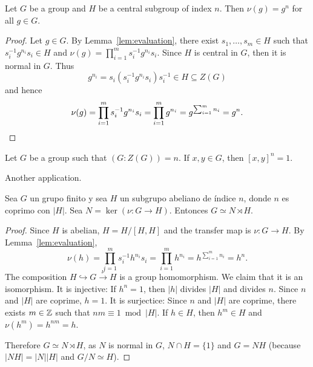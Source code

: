 
\begin{proposition}
	\label{prop:v(g)=g^n}
	Let $G$ be a group and $H$ be a central subgroup of index $n$. Then 
	$\nu(g)=g^n$ for all $g\in G$.
\end{proposition}

\begin{proof}
	Let $g\in G$. By Lemma~\ref{lem:evaluation}, there exist $s_1,\dots,s_m\in
	H$ such that $s_i^{-1}g^{n_i}s_i\in H$ and $\nu(g)=\prod_{i=1}^m
	s_i^{-1}g^{n_i}s_i$.  Since $H$ is central in $G$, then it is normal in $G$. Thus 
	\[
	g^{n_i}=s_i(s_i^{-1}g^{n_i}s_i)s_i^{-1}\in H\subseteq Z(G)
	\]
	and hence  
	\[
		\nu(g)
		=\prod_{i=1}^m s_i^{-1}g^{n_i}s_i
		=\prod_{i=1}^m g^{n_i}
		=g^{\sum_{i=1}^m n_i}
		=g^n.\qedhere
	\]
\end{proof}
%

\begin{exercise}
	\label{corollary:[x,y]^n=1}
	Let $G$ be a group such that $(G:Z(G))=n$. If $x,y\in G$, then $[x,y]^n=1$. 
\end{exercise}

Another application. 

\begin{proposition}
	\label{prop:semidirecto}
	Sea $G$ un grupo finito y sea $H$ un subgrupo abeliano de
	índice $n$, donde $n$ es coprimo con $|H|$.  Sea
	$N=\ker(\nu\colon G\to H)$. Entonces $G\simeq N\rtimes H$.
\end{proposition}

\begin{proof}
	Since $H$ is abelian, $H=H/[H,H]$ and the transfer map is 
	$\nu\colon G\to H$. By Lemma~\ref{lem:evaluation}, 
	\[
		\nu(h)
		=\prod_{i=1}^m s_i^{-1}h^{n_i}s_i
		=\prod_{i=1}^m h^{n_i}
		=h^{\sum_{i=1}^m n_i}=h^n.
	\]
	The composition $H\hookrightarrow G\xrightarrow{\nu} H$ is a group homomorphism. 
	We claim that it is an isomorphism. It is injective: If $h^n=1$, then 
	$|h|$ divides $|H|$ and divides $n$. Since $n$ and $|H|$ are
	coprime, $h=1$. It is surjectice: Since $n$ and $|H|$ are coprime, there exists 
	$m\in\mathbb{Z}$ such that $nm\equiv 1\bmod |H|$. If $h\in H$, then $h^m\in
	H$ and $\nu(h^m)=h^{nm}=h$. 

	Therefore $G\simeq N\rtimes H$, as $N$ is normal in $G$, $N\cap
	H=\{1\}$ and $G=NH$ (because $|NH|=|N||H|$ and $G/N\simeq H$).
\end{proof}

